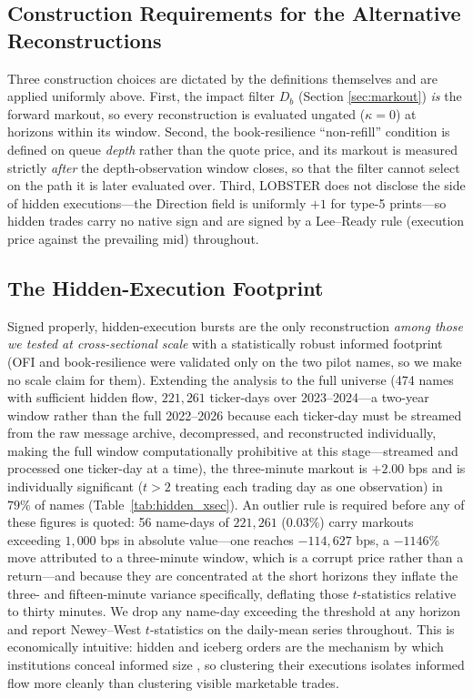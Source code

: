 \documentclass[11pt]{article}
\begin{document}
\subsection{Construction Requirements for the Alternative Reconstructions}
Three construction choices are dictated by the definitions themselves and are applied uniformly above. First, the impact filter $D_b$ (Section \ref{sec:markout}) \emph{is} the forward markout, so every reconstruction is evaluated ungated ($\kappa=0$) at horizons within its window. Second, the book-resilience ``non-refill'' condition is defined on queue \emph{depth} rather than the quote price, and its markout is measured strictly \emph{after} the depth-observation window closes, so that the filter cannot select on the path it is later evaluated over. Third, LOBSTER does not disclose the side of hidden executions---the Direction field is uniformly $+1$ for type-5 prints---so hidden trades carry no native sign and are signed by a Lee--Ready rule (execution price against the prevailing mid) throughout.

\subsection{The Hidden-Execution Footprint}
Signed properly, hidden-execution bursts are the only reconstruction \emph{among those we tested at cross-sectional scale} with a statistically robust informed footprint (OFI and book-resilience were validated only on the two pilot names, so we make no scale claim for them). Extending the analysis to the full universe (474 names with sufficient hidden flow, $221{,}261$ ticker-days over 2023--2024---a two-year window rather than the full 2022--2026 because each ticker-day must be streamed from the raw message archive, decompressed, and reconstructed individually, making the full window computationally prohibitive at this stage---streamed and processed one ticker-day at a time), the three-minute markout is $+2.00$ bps and is individually significant ($t>2$ treating each trading day as one observation) in $79\%$ of names (Table~\ref{tab:hidden_xsec}). An outlier rule is required before any of these figures is quoted: 56 name-days of $221{,}261$ ($0.03\%$) carry markouts exceeding $1{,}000$ bps in absolute value---one reaches $-114{,}627$ bps, a $-1146\%$ move attributed to a three-minute window, which is a corrupt price rather than a return---and because they are concentrated at the short horizons they inflate the three- and fifteen-minute variance specifically, deflating those $t$-statistics relative to thirty minutes. We drop any name-day exceeding the threshold at any horizon and report Newey--West $t$-statistics on the daily-mean series throughout. This is economically intuitive: hidden and iceberg orders are the mechanism by which institutions conceal informed size \citep{bessembinder2009,hautsch2012}, so clustering their executions isolates informed flow more cleanly than clustering visible marketable trades.
\end{document}
